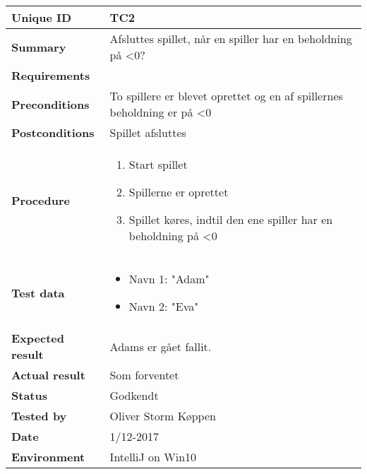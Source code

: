 \begin{table}[H]
    \begin{center}
        \begin{tabular}{|l|p{8cm}|}
            \hline
            \textbf{Unique ID} & TC2 \\
            \hline
            \textbf{Summary} & Afsluttes spillet, når en spiller har en beholdning på <0? \\
            \hline
            \textbf{Requirements} & \\
            \hline
            \textbf{Preconditions} & To spillere er blevet oprettet og en af spillernes beholdning er på <0\\
            \hline
            \textbf{Postconditions} & Spillet afsluttes\\
            \hline
            \textbf{Procedure} & \begin{enumerate}
                \setlength\itemsep{0ex}
                \item Start spillet
                \item Spillerne er oprettet
                \item Spillet køres, indtil den ene spiller har en beholdning på <0
            \end{enumerate} \\
            \hline
            \textbf{Test data} & \begin{itemize}
                \setlength\itemsep{0ex}
                \item Navn 1: "Adam"
                \item Navn 2: "Eva"
            \end{itemize} \\
            \hline
            \textbf{Expected result} & Adams er gået fallit. \\
            \hline
            \textbf{Actual result} & Som forventet \\
            \hline
            \textbf{Status} & Godkendt \\
            \hline
            \textbf{Tested by} & Oliver Storm Køppen \\
            \hline
            \textbf{Date} & 1/12-2017 \\
            \hline
            \textbf{Environment} & IntelliJ on Win10 \\
            \hline
        \end{tabular}
    \end{center}
\end{table}
